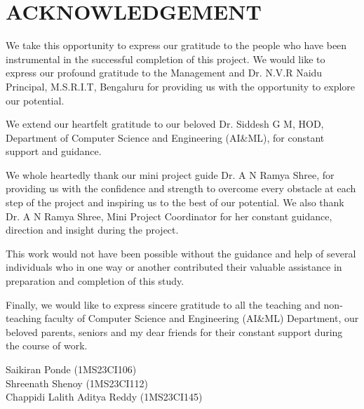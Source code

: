 
    \chapter*{\centering ACKNOWLEDGEMENT}


%

We take this opportunity to express our gratitude to the people who have been instrumental in the successful completion of this project. We would like to express our profound gratitude to the Management and Dr. N.V.R Naidu Principal, M.S.R.I.T, Bengaluru for providing us with the opportunity to explore our potential.

We extend our heartfelt gratitude to our beloved Dr. Siddesh G M, HOD, Department of
Computer Science and Engineering (AI&ML), for constant support and guidance.

We whole heartedly thank our mini project guide Dr. A N Ramya Shree, for providing us with the confidence and strength to overcome every obstacle at each step of the project and inspiring us to the best of our potential. We also thank Dr. A N Ramya Shree, Mini Project Coordinator for her constant guidance, direction and insight during the project.

This work would not have been possible without the guidance and help of several individuals who in one way or another contributed their valuable assistance in preparation and completion of this study.

Finally, we would like to express sincere gratitude to all the teaching and non-teaching faculty of Computer Science and Engineering (AI&ML) Department, our beloved parents, seniors and my dear friends for their constant support during the course of work.
\\


\begin{flushright}
Saikiran Ponde (1MS23CI106)\\
Shreenath Shenoy (1MS23CI112)\\
Chappidi Lalith Aditya Reddy (1MS23CI145)\\
\end{flushright}


\thispagestyle{plain}
